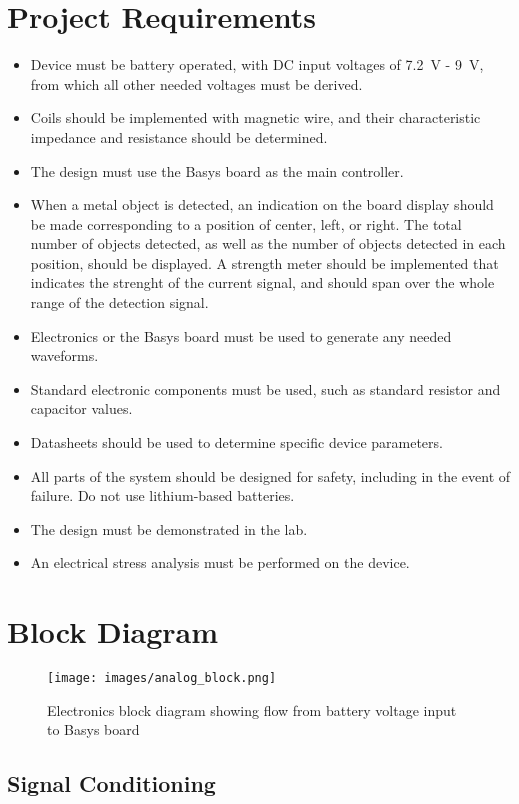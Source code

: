 \documentclass[12pt]{article}
\numberwithin{figure}{section}
\numberwithin{equation}{section}
\begin{document}
\section{Project Requirements} 
\begin{itemize} 
    \item Device must be battery operated, with DC input voltages of \SI{7.2}{\volt} - \SI{9}{\volt}, from which all other needed voltages must be derived. 
    \item Coils should be implemented with magnetic wire, and their characteristic impedance and resistance should be determined.
    \item The design must use the Basys board as the main controller.
    \item When a metal object is detected, an indication on the board display should be made corresponding to a position of center, left, or right.  The total number of objects detected, as well as the number of objects detected in each position, should be displayed. A strength meter should be implemented that indicates the strenght of the current signal, and should span over the whole range of the detection signal.
    \item Electronics or the Basys board must be used to generate any needed waveforms. 
    \item Standard electronic components must be used, such as standard resistor and capacitor values.
    \item Datasheets should be used to determine specific device parameters. 
    \item All parts of the system should be designed for safety, including in the event of failure.  Do not use lithium-based batteries.
    \item The design must be demonstrated in the lab.
    \item An electrical stress analysis must be performed on the device.
\end{itemize}
\section{Block Diagram} 
\begin{figure}[ht] 
    \centering
    \texttt{[image: images/analog\_block.png]}
    \caption{Electronics block diagram showing flow from battery voltage input to Basys board}
\end{figure} 

\subsection{Signal Conditioning} 
\end{document}
